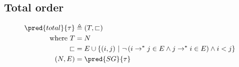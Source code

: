 \subsection{Total order}

\begin{align*}
	\pred{total}{\tau} &\triangleq (T, \sqsubset) \\
	\text{where } T &= N \\
	\sqsubset &= E \cup \{ (i, j)\ |\ \lnot \left( i \rightarrow^* j \in E \land j \rightarrow^* i \in E \right) \land i < j \} \\
	(N, E) &= \pred{SG}{\tau}
\end{align*}
